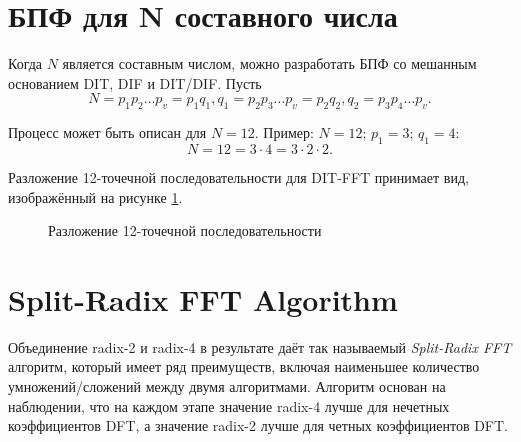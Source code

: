 \section{БПФ для N составного числа}
Когда $N$ является составным числом, можно разработать БПФ со мешанным основанием DIT, DIF и DIT/DIF. Пусть
\begin{equation}\label{eq: N decomposition}
N = p_1 p_2 \dots p_v = p_1 q_1, q_1 = p_2 p_3 \dots p_v = p_2 q_2, q_2 = p_3 p_4 \dots p_v.
\end{equation}

Процесс может быть описан для $N = 12$. Пример: $N = 12$; $p_1 = 3$; $q_1 = 4$:
\begin{equation}\label{eq: N decomposition example}
N = 12 = 3 \cdot 4 = 3 \cdot 2 \cdot 2.
\end{equation}

Разложение 12-точечной последовательности для DIT-FFT принимает вид, изображённый на рисунке \ref{figure: 12 point decomposition}.
\begin{figure}
\centering
{}
\caption{Разложение 12-точечной последовательности}
\label{figure: 12 point decomposition}
\end{figure}

\section{Split-Radix FFT Algorithm}
Объединение radix-2 и radix-4 в результате даёт так называемый \textit{Split-Radix FFT} алгоритм, который имеет ряд преимуществ, включая наименьшее количество умножений/сложений между двумя алгоритмами. Алгоритм основан на наблюдении, что на каждом этапе значение radix-4 лучше для нечетных коэффициентов DFT, а значение radix-2 лучше для четных коэффициентов DFT.

